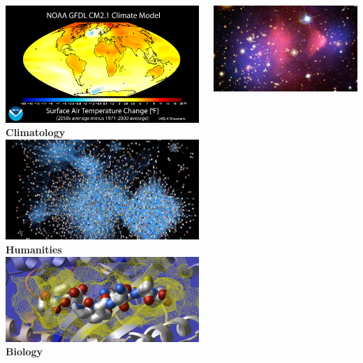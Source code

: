 \documentclass{beamer}
\begin{document}
\begin{frame}
  \centering
  \begin{columns}
    \begin{column}{0.5\textwidth}
      \centering
      \includegraphics[width=0.8\columnwidth]{figures/gfdl_2050.png}
      \\
      \textbf{Climatology}
      \includegraphics[width=0.8\columnwidth]{figures/networks-2.jpg}
      \\
      \textbf{Humanities}
      \includegraphics[width=0.8\columnwidth]{figures/protein.jpg}\\
      \textbf{Biology}
    \end{column}
    \begin{column}{0.5\textwidth}
      \centering
      \includegraphics[width=0.8\columnwidth]{figures/dark_matter.jpg}

\end{column}
\end{columns}
\end{frame}
\end{document}
